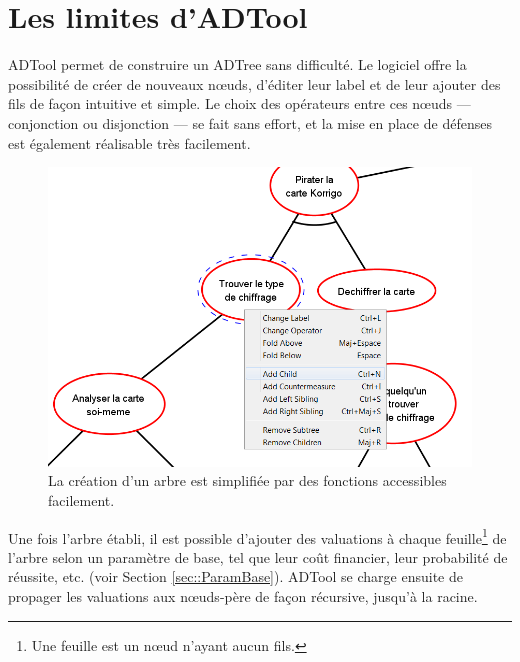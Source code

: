 \section{Les limites d'ADTool}
	\label{sec:adtool}

	ADTool permet de construire un ADTree sans difficulté. Le logiciel offre la possibilité de créer de nouveaux nœuds, d'éditer leur label et de leur ajouter des fils de façon intuitive et simple. Le choix des opérateurs entre ces nœuds --- conjonction ou disjonction ---  se fait sans effort, et la mise en place de défenses est également réalisable très facilement. 
	
	\begin{figure}[h]
            \centering
            \includegraphics[width=1\textwidth]{figure/adtool_add_child.png}
            \caption{La création d'un arbre est simplifiée par des fonctions accessibles facilement.}
            \label{fig:arbre_exemple_1}
    \end{figure}
	
	
	Une fois l'arbre établi, il est possible d'ajouter des valuations à chaque feuille\footnote{Une feuille est un nœud n'ayant aucun fils.} de l'arbre selon un paramètre de base, tel que leur coût financier, leur probabilité de réussite, etc. (voir Section \ref{sec::ParamBase}). ADTool se charge ensuite de propager les valuations aux nœuds-père de façon récursive, jusqu'à la racine.
	
